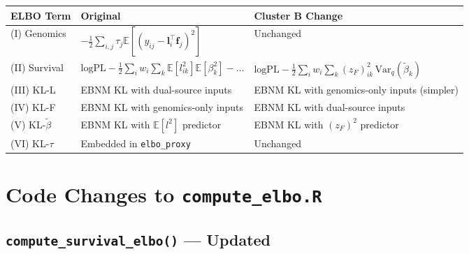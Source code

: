 \documentclass[11pt]{article}
\newcommand{\E}{\mathbb{E}}
\newcommand{\Var}{\mathrm{Var}}
\begin{document}
\begin{center}
\renewcommand{\arraystretch}{1.4}
\begin{tabular}{lll}
\hline
\textbf{ELBO Term} & \textbf{Original} & \textbf{Cluster B Change} \\
\hline
(I) Genomics & $-\tfrac{1}{2}\sum_{i,j}\tau_j\E[(y_{ij}-\mathbf{l}_i^\top\mathbf{f}_j)^2]$ & Unchanged \\
(II) Survival & $\mathrm{logPL} - \tfrac{1}{2}\sum_i w_i\sum_k \E[l_{ik}^2]\E[\beta_k^2] - \ldots$ & $\mathrm{logPL} - \tfrac{1}{2}\sum_i w_i\sum_k (z_F)_{ik}^2\,\Var_q(\tilde\beta_k)$ \\
(III) KL-L & EBNM KL with dual-source inputs & EBNM KL with genomics-only inputs (simpler) \\
(IV) KL-F & EBNM KL with genomics-only inputs & EBNM KL with dual-source inputs \\
(V) KL-$\tilde\beta$ & EBNM KL with $\E[l^2]$ predictor & EBNM KL with $(z_F)^2$ predictor \\
(VI) KL-$\tau$ & Embedded in \texttt{elbo\_proxy} & Unchanged \\
\hline
\end{tabular}
\end{center}

\section{Code Changes to \texttt{compute\_elbo.R}}

\subsection{\texttt{compute\_survival\_elbo()} — Updated}
\end{document}
